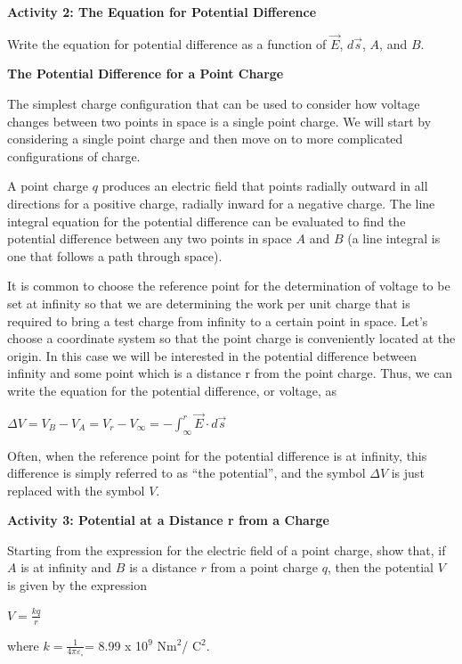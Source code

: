 \textbf{Activity 2: The Equation for Potential Difference}

Write the equation for potential difference as a function of \( \overrightarrow{E} \),
\( d\overrightarrow{s} \), $A$, and $B$.
\answerspace{15mm}

\textbf{The Potential Difference for a Point Charge}

The simplest charge configuration that can be used to consider how
voltage changes between two points in space is a single point charge.
We will start by considering a single point charge and then move on
to more complicated configurations of charge.

A point charge $q$ produces an electric field that points radially outward
in all directions for a positive charge, radially inward for a negative charge. The line integral equation for the potential difference
can be evaluated to find the potential difference between any two
points in space $A$ and $B$ (a line integral is one that follows a path
through space).

It is common to choose the reference point for the determination of
voltage to be set at infinity so that we are determining the work
per unit charge that is required to bring a test charge from infinity
to a certain point in space. Let's choose a coordinate system so that
the point charge is conveniently located at the origin. In this case
we will be interested in the potential difference between infinity
and some point which is a distance r from the point charge. Thus,
we can write the equation for the potential difference, or voltage,
as

{\centering \( \Delta V=V_{B}-V_{A}=V_{r}-V_{\infty }=-\int ^{r}_{\infty }\overrightarrow{E}\cdot d\overrightarrow{s} \)\par}

Often, when the reference point for the potential difference is at
infinity, this difference is simply referred to as {}``the potential'',
and the symbol \( \Delta V \) is just replaced with the symbol $V$.

\textbf{Activity 3: Potential at a Distance r from a Charge}

Starting from the expression for the electric field of a point charge,
show that, if $A$ is at infinity and $B$ is a distance $r$ from a point
charge $q$, then the potential $V$ is given by the expression

{\centering \( V=\frac{kq}{r} \)\par}

where \( k=\frac{1}{4\pi \varepsilon _{\circ }} \)= 8.99 x 10\( ^{9} \)
Nm\( ^{2} \)/ C\( ^{2} \).

